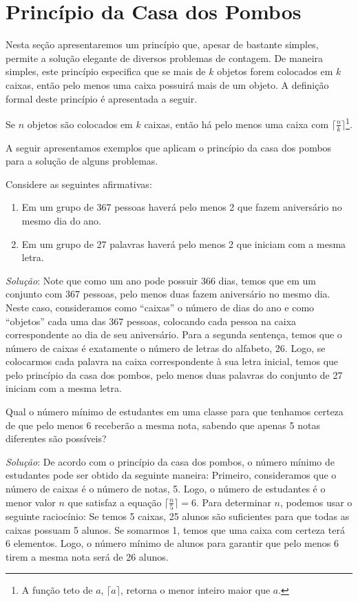 \section{Princípio da Casa dos Pombos}

Nesta seção apresentaremos um princípio que, apesar de bastante
simples, permite a solução elegante de diversos problemas de
contagem. De maneira simples, este princípio especifica que se mais
de $k$ objetos forem colocados em $k$ caixas, então pelo menos uma
caixa possuirá mais de um objeto. A definição formal deste princípio é
apresentada a seguir.

\begin{Definition}
Se $n$ objetos são colocados em $k$ caixas, então há pelo menos uma
caixa com $\lceil \frac{n}{k} \rceil$\footnote{A função teto de $a$,
  $\lceil a \rceil$, retorna o menor inteiro maior que $a$.}.
\end{Definition}

A seguir apresentamos exemplos que aplicam o princípio da casa dos
pombos para a solução de alguns problemas.

\begin{Example}
Considere as seguintes afirmativas:
\begin{enumerate}
  \item Em um grupo de 367 pessoas haverá pelo menos 2 que fazem
    aniversário no mesmo dia do ano.
  \item Em um grupo de 27 palavras haverá pelo menos 2 que iniciam com
    a mesma letra.
\end{enumerate}

\textit{Solução}: Note que como um ano pode possuir 366 dias, temos
que em um conjunto com 367 pessoas, pelo menos duas fazem aniversário
no mesmo dia. Neste caso, consideramos como ``caixas'' o número de
dias do ano e como ``objetos'' cada uma das 367 pessoas, colocando
cada pessoa na caixa correspondente ao dia de seu aniversário. Para a
segunda sentença, temos que o número de caixas é exatamente o número
de letras do alfabeto, 26. Logo, se colocarmos cada palavra na caixa
correspondente à sua letra inicial, temos que pelo princípio da casa
dos pombos, pelo menos duas palavras do conjunto de 27 iniciam com a
mesma letra.
\end{Example}

\begin{Example}
Qual o número mínimo de estudantes em uma classe para
que tenhamos certeza de que pelo menos 6 receberão a mesma nota,
sabendo que apenas 5 notas diferentes são possíveis?

\textit{Solução}: De acordo com o princípio da casa dos pombos, o
número mínimo de estudantes pode ser obtido da seguinte maneira:
Primeiro, consideramos que o número de caixas é o número de notas,
5. Logo, o número de estudantes é o menor valor $n$ que satisfaz a
equação $\lceil \frac{n}{5} \rceil = 6$. Para determinar $n$, podemos
usar o seguinte raciocínio: Se temos 5 caixas, 25 alunos são
suficientes para que todas as caixas possuam 5 alunos. Se somarmos 1,
temos que uma caixa com certeza terá 6 elementos. Logo, o número
mínimo de alunos para garantir que pelo menos 6 tirem a mesma nota
será de 26 alunos.
\end{Example}

